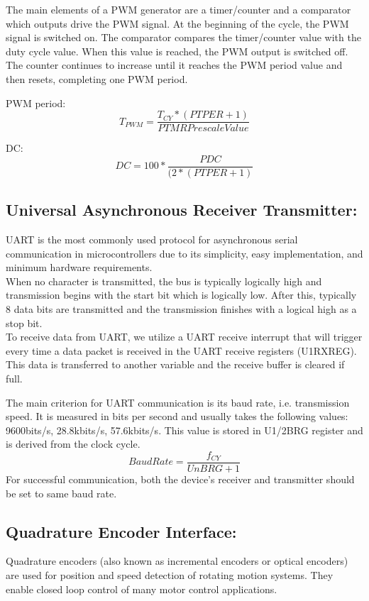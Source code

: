 The main elements of a PWM generator are a timer/counter and a comparator which outputs drive the PWM signal. At the beginning of the cycle, the PWM signal is switched on. The comparator compares the timer/counter value with the duty cycle value. When this value is reached, the PWM output is switched off. The counter continues to increase until it reaches the PWM period value and then resets, completing one PWM period.

PWM period:
$$T_{PWM}=\frac{T_{CY}*(PTPER+1)}{PTMR Prescale Value}$$

DC: 
$$DC=100* \frac{PDC}{(2*(PTPER+1)}$$


\subsection{Universal Asynchronous Receiver Transmitter:}

UART is the most commonly used protocol for asynchronous serial communication in microcontrollers due to its simplicity, easy implementation, and minimum hardware requirements.\\
When no character is transmitted, the bus is typically logically high and transmission begins with the start bit which is logically low. After this, typically 8 data bits are transmitted and the transmission finishes with a logical high as a stop bit.\\
To receive data from UART, we utilize a UART receive interrupt that will trigger every time a data packet is received in the UART receive registers (U1RXREG). This data is transferred to another variable and the receive buffer is cleared if full.

The main criterion for UART communication is its baud rate, i.e. transmission speed. It is measured in bits per second and usually takes the following values: 9600bits/s, 28.8kbits/s, 57.6kbits/s.
This value is stored in U1/2BRG register and is derived from the clock cycle.
$$BaudRate = \frac{f_{CY}}{UnBRG+1}$$
For successful communication, both the device’s receiver and transmitter should be set to same baud rate.


\subsection{Quadrature Encoder Interface:}

Quadrature encoders (also known as incremental encoders or optical encoders) are used for position and speed detection of rotating motion systems. They enable closed loop control of many motor control applications.

